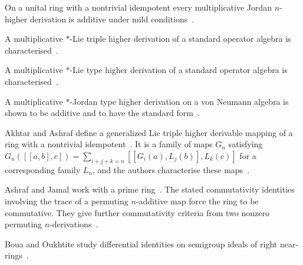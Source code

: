 On a unital ring with a nontrivial idempotent every multiplicative Jordan
$n$-higher derivation is additive under mild
conditions~\cite{WlMultiplicativeJordanType2022}.

A multiplicative $*$-Lie triple higher derivation of a standard operator
algebra is characterised~\cite{WlMultiplicativeStar-lieTrip2020}.

A multiplicative $*$-Lie type higher derivation of a standard operator algebra
is characterised~\cite{WlMultiplicativeStar-lieType2021}.

A multiplicative $*$-Jordan type higher derivation on a von Neumann algebra is
shown to be additive and to have the standard
form~\cite{WlMultiplicativeStar-jordanT2021}.

Akhtar and Ashraf define a generalized Lie triple higher derivable mapping of
a ring with a nontrivial idempotent~\cite{WlGeneralizedLieTripleHigherDeri2021}. It is a family of maps $G_n$ satisfying
$G_n([[a,b],c])=\sum_{i+j+k=n}[[G_i(a),L_j(b)],L_k(c)]$ for a corresponding
family $L_n$, and the authors characterise these
maps~\cite{WlGeneralizedLieTripleHigherDeri2021}.

Ashraf and Jamal work with a prime ring~\cite{WlTracesOfPermutingNAdditiveMaps2014}. The stated commutativity
identities involving the trace of a permuting $n$-additive map force the ring
to be commutative. They give further commutativity criteria from two nonzero
permuting $n$-derivations~\cite{WlTracesOfPermutingNAdditiveMaps2014}.

Boua and Oukhtite study differential identities on semigroup ideals of right
near-rings~\cite{WlDifferentialIdentitiesOnSemigr2013}.

